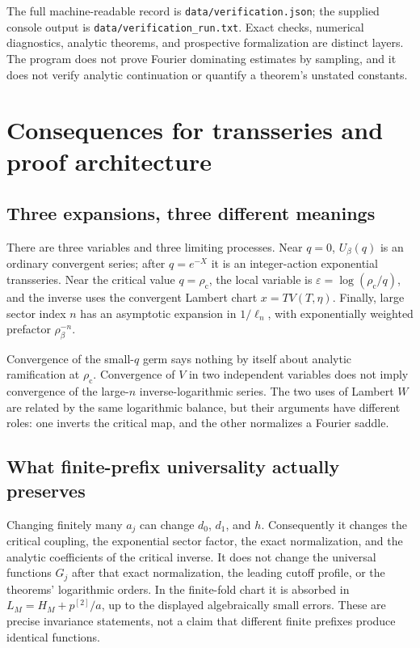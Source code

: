 \documentclass[11pt,a4paper]{article}
\numberwithin{equation}{section}
\theoremstyle{definition}
\theoremstyle{remark}
\newcommand{\rhoc}{\rho_{\mathrm c}}
\newcommand{\eps}{\varepsilon}
\begin{document}
The full machine-readable record is \texttt{data/verification.json};
the supplied console output is \texttt{data/verification\_run.txt}.
Exact checks, numerical diagnostics, analytic theorems, and prospective
formalization are distinct layers. The program does not prove Fourier
dominating estimates by sampling, and it does not verify analytic
continuation or quantify a theorem's unstated constants.

\section{Consequences for transseries and proof architecture}
\label{sec:interpretation}

\subsection{Three expansions, three different meanings}
There are three variables and three limiting processes. Near $q=0$,
$U_\beta(q)$ is an ordinary convergent series; after $q=e^{-X}$ it is
an integer-action exponential transseries. Near the critical value
$q=\rhoc$, the local variable is $\eps=\log(\rhoc/q)$, and the
inverse uses the convergent Lambert chart $x=TV(T,\eta)$. Finally,
large sector index $n$ has an asymptotic expansion in $1/\ell_n$,
with exponentially weighted prefactor $\rho_\beta^{-n}$.

Convergence of the small-$q$ germ says nothing by itself about analytic
ramification at $\rhoc$. Convergence of $V$ in two independent
variables does not imply convergence of the large-$n$ inverse-logarithmic
series. The two uses of Lambert $W$ are related by the same logarithmic
balance, but their arguments have different roles: one inverts the
critical map, and the other normalizes a Fourier saddle.

\subsection{What finite-prefix universality actually preserves}
Changing finitely many $a_j$ can change $d_0$, $d_1$, and $h$.
Consequently it changes the critical coupling, the exponential sector
factor, the exact normalization, and the analytic coefficients of the
critical inverse. It does not change the universal functions $G_j$
after that exact normalization, the leading cutoff profile, or the
theorems' logarithmic orders. In the finite-fold chart it is absorbed
in $L_M=H_M+p^{[2]}/a$, up to the displayed algebraically small
errors. These are precise invariance statements, not a claim that
different finite prefixes produce identical functions.
\end{document}
